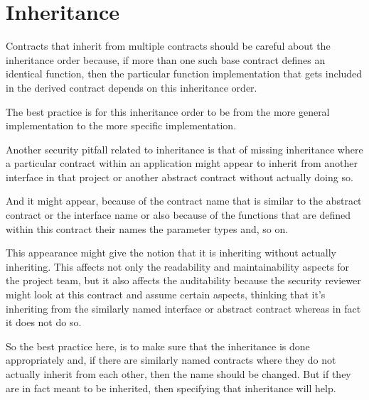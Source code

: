 \section{Inheritance}\label{inheritance}

Contracts that inherit from multiple contracts should be careful about
the inheritance order because, if more than one such base contract
defines an identical function, then the particular function
implementation that gets included in the derived contract depends on
this inheritance order.

The best practice is for this inheritance order to be from the more
general implementation to the more specific implementation.

Another security pitfall related to inheritance is that of missing
inheritance where a particular contract within an application might
appear to inherit from another interface in that project or another
abstract contract without actually doing so.

And it might appear, because of the contract name that is similar to the
abstract contract or the interface name or also because of the functions
that are defined within this contract their names the parameter types
and, so on.

This appearance might give the notion that it is inheriting without
actually inheriting. This affects not only the readability and
maintainability aspects for the project team, but it also affects the
auditability because the security reviewer might look at this contract
and assume certain aspects, thinking that it's inheriting from the
similarly named interface or abstract contract whereas in fact it does
not do so.

So the best practice here, is to make sure that the inheritance is done
appropriately and, if there are similarly named contracts where they do
not actually inherit from each other, then the name should be changed.
But if they are in fact meant to be inherited, then specifying that
inheritance will help.
